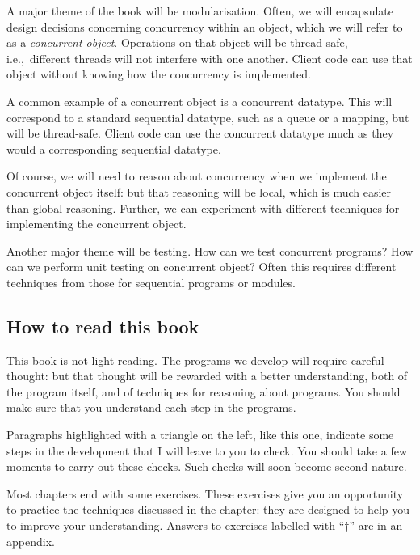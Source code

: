 
A major theme of the book will be modularisation.  Often, we will encapsulate
design decisions concerning concurrency within an object, which we will refer
to as a \emph{concurrent object}.  Operations on that object will be
thread-safe, i.e.,~different threads will not interfere with one another.
Client code can use that object without knowing how the concurrency is
implemented.  

A common example of a concurrent object is a concurrent datatype.  This
will correspond to a standard sequential datatype, such as a queue or a
mapping, but will be thread-safe.  Client code can use the concurrent datatype
much as they would a corresponding sequential datatype.

Of course, we will need to reason about concurrency when we implement the
concurrent object itself: but that reasoning will be local, which is much
easier than global reasoning.  Further, we can experiment with different
techniques for implementing the concurrent object.

Another major theme will be testing.  How can we test concurrent programs?
How can we perform unit testing on concurrent object?  Often this requires
different techniques from those for sequential programs or modules.


\subsection*{How to read this book}

This book is not light reading.  The programs we develop will require careful
thought: but that thought will be rewarded with a better understanding, both
of the program itself, and of techniques for reasoning about programs.  You
should make sure that you understand each step in the programs.
%
\begin{instruction}
Paragraphs highlighted with a triangle on the left, like this one, indicate
some steps in the development that I will leave to you to check.  You should
take a few moments to carry out these checks.  Such checks will soon become
second nature.   
\end{instruction}
%
Most chapters  end with some exercises.  These exercises give you an
opportunity to practice the techniques discussed in the chapter: they are
designed to help you to improve your understanding.  Answers to exercises
labelled with ``$\dag$'' are in an appendix.

